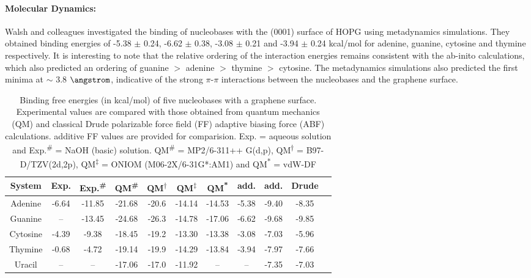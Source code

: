 \paragraph{Molecular Dynamics:} Walsh and colleagues investigated the binding of nucleobases with the (0001) surface of HOPG using metadynamics simulations.\supercite{hughes_adsorption_2017} They obtained binding energies of -5.38 $\pm$ 0.24, -6.62 $\pm$ 0.38, -3.08 $\pm$ 0.21 and  -3.94 $\pm$ 0.24 kcal/mol for adenine, guanine, cytosine and thymine respectively. It is interesting to note that the relative ordering of the interaction energies remains consistent with the ab-inito calculations, which also predicted an ordering of guanine $>$ adenine $>$ thymine $>$ cytosine. The metadynamics simulations also predicted the first minima at $\sim$ 3.8 $\angstrom$, indicative of the strong $\pi$-$\pi$ interactions between the nucleobases and the graphene surface.
\begin{landscape}
    \begin{table}
        \centering
        \normalsize
        \caption[Binding free energies (in kcal/mol) of five nucleobases with a graphene surface]{Binding free energies (in kcal/mol) of five nucleobases with a graphene surface. Experimental values are compared with those obtained from quantum mechanics (QM) and classical Drude polarizable force field (FF) adaptive biasing force (ABF) calculations. additive FF values are provided for comparision. Exp. = aqueous solution and Exp.\textsuperscript{\#} = NaOH (basic) solution. QM\textsuperscript{\#} = MP2/6-311++ G(d,p), QM\textsuperscript{$\dag$} = B97-D/TZV(2d,2p), QM\textsuperscript{$\ddag$} = ONIOM (M06-2X/6-31G*:AM1) and QM\textsuperscript{*} = vdW-DF}
        \label{tbl:example1}
        \begin{tabular}{ccccccccccc}
            \toprule
            System & Exp.\supercite{varghese_binding_2009} & Exp.\textsuperscript{\#}\supercite{varghese_binding_2009} & QM\textsuperscript{\#}\supercite{gowtham_physisorption_2007} & QM\textsuperscript{$\dag$}\supercite{antony_structures_2008} & QM\textsuperscript{$\ddag$}\supercite{umadevi_quantum_2011} & QM\textsuperscript{*}\supercite{cho_noncovalent_2013} &add. \supercite{hughes_adsorption_2017} & add. \supercite{h_polarization_2021} & Drude \supercite{h_polarization_2021}\\ \midrule
            Adenine & -6.64 & -11.85 & -21.68 & -20.6 & -14.14 & -14.53 &-5.38 & -9.40 & -8.35\\
            Guanine & -- & -13.45 &-24.68 & -26.3 & -14.78 & -17.06 &-6.62 & -9.68 & -9.85\\
            Cytosine & -4.39 & -9.38 & -18.45 & -19.2 & -13.30 & -13.38 &-3.08 & -7.03 & -5.96\\
            Thymine & -0.68 & -4.72 & -19.14 & -19.9 & -14.29 & -13.84 &-3.94 & -7.97 & -7.66\\
            Uracil & -- & -- & -17.06 & -17.0 & -11.92 & -- & -- & -7.35 &  -7.03\\ \bottomrule
        \end{tabular}
      \end{table}   
\end{landscape}


